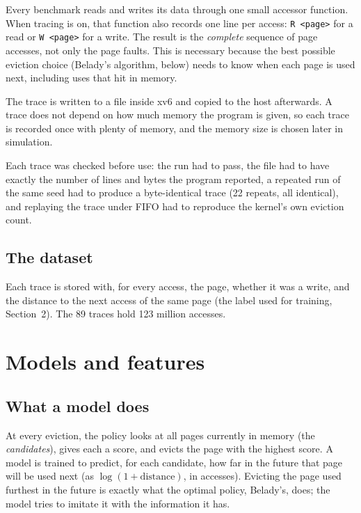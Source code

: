 \documentclass[10.5pt,a4paper]{article}
\newcommand{\code}[1]{\texttt{#1}}
\begin{document}
Every benchmark reads and writes its data through one small accessor
function. When tracing is on, that function also records one line per access:
\code{R <page>} for a read or \code{W <page>} for a write. The result is the
\emph{complete} sequence of page accesses, not only the page faults. This is
necessary because the best possible eviction choice (Belady's algorithm,
below) needs to know when each page is used next, including uses that hit in
memory.

The trace is written to a file inside xv6 and copied to the host afterwards.
A trace does not depend on how much memory the program is given, so each
trace is recorded once with plenty of memory, and the memory size is chosen
later in simulation.

Each trace was checked before use: the run had to pass, the file had to have
exactly the number of lines and bytes the program reported, a repeated run of
the same seed had to produce a byte-identical trace (22 repeats, all
identical), and replaying the trace under FIFO had to reproduce the kernel's own
eviction count.

\subsection{The dataset}

Each trace is stored with, for every access, the page, whether it was a
write, and the distance to the next access of the same page (the label used
for training, Section~2). The 89 traces hold 123 million accesses.

\section{Models and features}

\subsection{What a model does}

At every eviction, the policy looks at all pages currently in memory (the
\emph{candidates}), gives each a score, and evicts the page with the highest
score. A model is trained to predict, for each candidate, how far in the
future that page will be used next (as $\log(1+\text{distance})$, in
accesses). Evicting the page used furthest in the future is exactly what the
optimal policy, Belady's, does; the model tries to imitate it with the
information it has.
\end{document}
